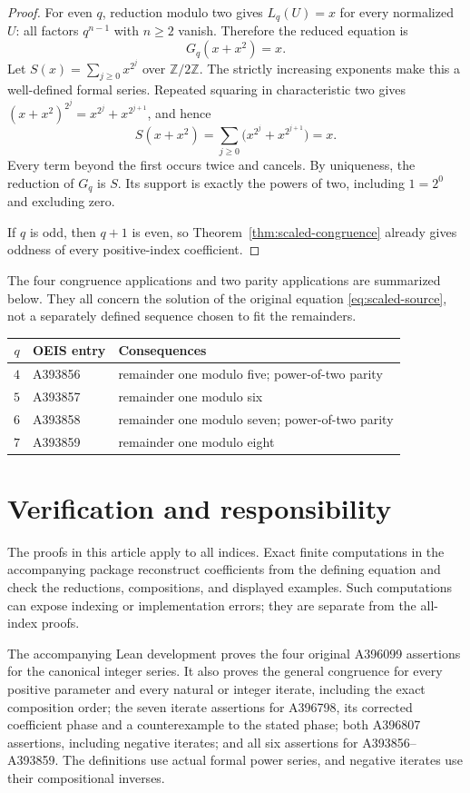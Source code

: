 \documentclass[11pt,a4paper]{article}
\theoremstyle{remark}
\newcommand{\Z}{\mathbb Z}
\begin{document}
\begin{proof}
For even $q$, reduction modulo two gives $L_q(U)=x$ for every
normalized $U$: all factors $q^{n-1}$ with $n\ge2$ vanish.
Therefore the reduced equation is
\[
G_q(x+x^2)=x.
\]
Let $S(x)=\sum_{j\ge0}x^{2^j}$ over $\Z/2\Z$.
The strictly increasing exponents make this a well-defined formal
series. Repeated squaring in characteristic two gives
$(x+x^2)^{2^j}=x^{2^j}+x^{2^{j+1}}$, and hence
\[
S(x+x^2)
=\sum_{j\ge0}\bigl(x^{2^j}+x^{2^{j+1}}\bigr)=x.
\]
Every term beyond the first occurs twice and cancels. By uniqueness,
the reduction of $G_q$ is $S$. Its support is exactly the powers
of two, including $1=2^0$ and excluding zero.

If $q$ is odd, then $q+1$ is even, so
Theorem~\ref{thm:scaled-congruence} already gives oddness of every
positive-index coefficient.
\end{proof}

The four congruence applications and two parity applications are
summarized below. They all concern the solution of the original
equation \eqref{eq:scaled-source}, not a separately defined sequence
chosen to fit the remainders.

\begin{center}
\begin{tabular}{@{}cll@{}}
\toprule
$q$ & OEIS entry & Consequences\\
\midrule
$4$ & A393856 & remainder one modulo five; power-of-two parity\\
$5$ & A393857 & remainder one modulo six\\
$6$ & A393858 & remainder one modulo seven; power-of-two parity\\
$7$ & A393859 & remainder one modulo eight\\
\bottomrule
\end{tabular}
\end{center}

\section*{Verification and responsibility}

The proofs in this article apply to all indices. Exact finite
computations in the accompanying package reconstruct coefficients
from the defining equation and check the reductions, compositions,
and displayed examples. Such computations can expose indexing or
implementation errors; they are separate from the all-index proofs.

The accompanying Lean development proves the four original A396099
assertions for the canonical integer series. It also proves the
general congruence for every positive parameter and every natural or
integer iterate, including the exact composition order; the seven
iterate assertions for A396798, its corrected coefficient phase and
a counterexample to the stated phase; both A396807 assertions,
including negative iterates; and all six assertions for
A393856--A393859. The definitions use actual formal power series,
and negative iterates use their compositional inverses.
\end{document}
